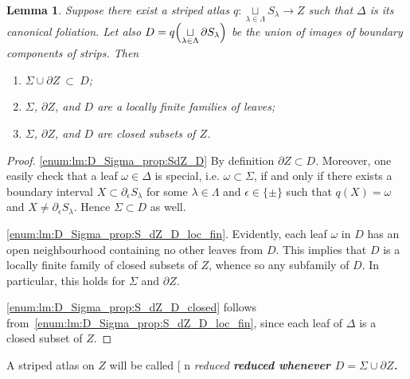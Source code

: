 \documentclass[12pt, reqno]{amsart}
\makeatletter
\newcommand{\lemmaname}{Lemma}%
\newtheorem{lemma}[subsection]{\protect\lemmaname}
\def\myemphInternal#1{\if n\f@shape%
\begingroup\itshape #1\endgroup\/%
\else\begingroup\bfseries #1\endgroup%
\fi}
\def\myemph{\futurelet\testchar\MaybeOptArgmyemph}
\def\MaybeOptArgmyemph{\ifx[\testchar \let\next\OptArgmyemph
                 \else \let\next\NoOptArgmyemph \fi \next}
\def\OptArgmyemph[#1]#2{\index{#1}\myemphInternal{#2}}
\def\NoOptArgmyemph#1{\myemphInternal{#1}}
\newcommand{\Partition}{\Delta}
\newcommand{\strip}{S}
\newcommand{\stripSurf}{Z}
\newcommand{\bdX}{X}
\newcommand{\stInd}{{\lambda}}
\newcommand{\StInd}{\Lambda}
\newcommand{\qmap}{q}
\makeatother
\begin{document}
\begin{lemma}\label{lm:D_Sigma_prop}
Suppose there exist a striped atlas $\qmap:\mathop{\sqcup}\limits_{\stInd\in\StInd} \strip_{\stInd} \to \stripSurf$ such that $\Partition$ is its canonical foliation.
Let also $D = \qmap\Bigl( \mathop{\sqcup}\limits_{\stInd\in\StInd} \partial\strip_{\stInd}\Bigr)$ be the union of images of boundary components of strips.
Then
\begin{enumerate}[leftmargin=*, label={\rm(\roman*)}]
\item\label{enum:lm:D_Sigma_prop:SdZ_D}
 $\Sigma\cup\partial\stripSurf \ \subset \ D$;
\item\label{enum:lm:D_Sigma_prop:S_dZ_D_loc_fin}
$\Sigma$, $\partial\stripSurf$, and $D$ are a locally finite families of leaves;
\item\label{enum:lm:D_Sigma_prop:S_dZ_D_closed} $\Sigma$, $\partial\stripSurf$, and $D$ are closed subsets of $\stripSurf$.
\end{enumerate}
\end{lemma}
\begin{proof}
\ref{enum:lm:D_Sigma_prop:SdZ_D}
By definition $\partial\stripSurf\subset D$.
Moreover, one easily check that a leaf $\omega\in\Partition$ is special, i.e.\! $\omega\subset\Sigma$, if and only if there exists a boundary interval $\bdX\subset \partial_{\epsilon}\strip_{\stInd}$ for some $\stInd\in\StInd$ and $\epsilon\in\{\pm\}$ such that $\qmap(\bdX) = \omega$ and $\bdX \not=\partial_{\epsilon}\strip_{\stInd}$.
Hence $\Sigma\subset D$ as well.

\ref{enum:lm:D_Sigma_prop:S_dZ_D_loc_fin}.
Evidently, each leaf $\omega$ in $D$ has an open neighbourhood containing no other leaves from $D$.
This implies that $D$ is a locally finite family of closed subsets of $\stripSurf$, whence so any subfamily of $D$.
In particular, this holds for $\Sigma$ and $\partial\stripSurf$.

\ref{enum:lm:D_Sigma_prop:S_dZ_D_closed} follows from~\ref{enum:lm:D_Sigma_prop:S_dZ_D_loc_fin}, since each leaf of $\Partition$ is a closed subset of $\stripSurf$.
\end{proof}

A striped atlas on $\stripSurf$ will be called \myemph{reduced} whenever $D = \Sigma \cup \partial\stripSurf$.
\end{document}
